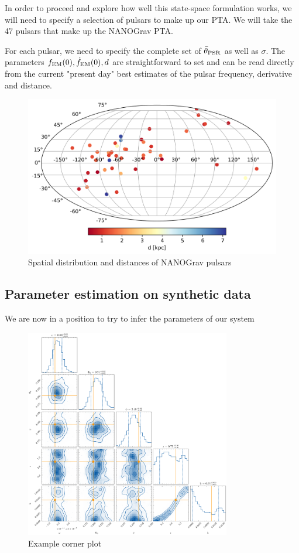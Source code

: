 \documentclass[fleqn,usenatbib,useAMS]{mnras}
\begin{document}
In order to proceed and explore how well this state-space formulation works, we will need to specify a selection of pulsars to make up our PTA. We will take the 47 pulsars that make up the NANOGrav PTA. 






For each pulsar, we need to specify the complete set of $\bar{\theta}_{\rm PSR}$ as well as $\sigma$. The parameters $f_{\rm EM}(0), \dot{f}_{\rm EM}(0),d$ are straightforward to set and can be read directly from  the current "present day" best estimates of the pulsar frequency, derivative and distance. 


\begin{figure}
	\includegraphics[width=0.8\columnwidth]{images/pulsars}
	\caption{Spatial distribution and distances of NANOGrav pulsars}
	\label{fig:pulsar_distrib}
\end{figure}




\subsection{Parameter estimation on synthetic data}
We are now in a position to try to infer the parameters of our system 


\begin{figure}
	\includegraphics[width=0.8\textwidth]{images/corner_example}
	\caption{Example corner plot}
	\label{fig:corner}
\end{figure}
\end{document}
